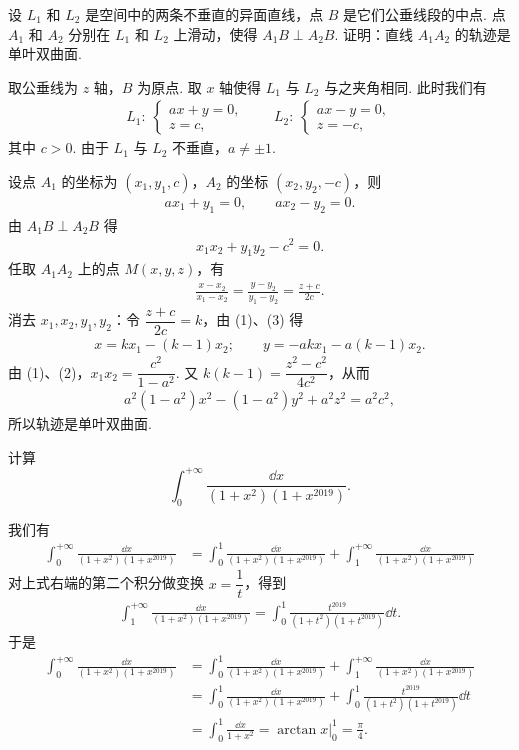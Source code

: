 
设 $L_1$ 和 $L_2$ 是空间中的两条不垂直的异面直线，点 $B$ 是它们公垂线段的中点. 点 $A_1$ 和 $A_2$ 分别在 $L_1$ 和 $L_2$ 上滑动，使得 $A_1B\perp A_2B$. 证明：直线 $A_1A_2$ 的轨迹是单叶双曲面.
\begin{solution}
取公垂线为 $z$ 轴，$B$ 为原点. 取 $x$ 轴使得 $L_1$ 与 $L_2$ 与之夹角相同. 此时我们有
\begin{align*}
L_1:\ \begin{cases}
  ax+y=0,\\
  z=c,
\end{cases}
\qquad
L_2:\ \begin{cases}
  ax-y=0,\\
  z=-c,
\end{cases}
\end{align*}
其中 $c>0$. 由于 $L_1$ 与 $L_2$ 不垂直，$a\ne\pm1$.

设点 $A_1$ 的坐标为 $(x_1,y_1,c)$，$A_2$ 的坐标 $(x_2,y_2,-c)$，则
\begin{align*}
ax_1+y_1=0,\qquad ax_2-y_2=0. \tag{1}
\end{align*}
由 $A_1B\perp A_2B$ 得
\begin{align*}
x_1x_2+y_1y_2-c^2=0. \tag{2}
\end{align*}
任取 $A_1A_2$ 上的点 $M(x,y,z)$，有
\begin{align*}
\frac{x-x_2}{x_1-x_2}=\frac{y-y_2}{y_1-y_2}=\frac{z+c}{2c}. \tag{3}
\end{align*}
消去 $x_1,x_2,y_1,y_2$：令 $\dfrac{z+c}{2c}=k$，由 (1)、(3) 得
\begin{align*}
x=kx_1-(k-1)x_2;\qquad y=-akx_1-a(k-1)x_2.
\end{align*}
由 (1)、(2)，$x_1x_2=\dfrac{c^2}{1-a^2}$. 又 $k(k-1)=\dfrac{z^2-c^2}{4c^2}$，从而
\begin{align*}
a^2(1-a^2)x^2-(1-a^2)y^2+a^2z^2=a^2c^2,
\end{align*}
所以轨迹是单叶双曲面.
\end{solution}

计算
\[
  \int_0^{+\infty}\frac{\dd x}{(1+x^2)(1+x^{2019})}.
\]
\begin{solution}
我们有
\begin{align*}
\int_0^{+\infty}\frac{\dd x}{(1+x^2)(1+x^{2019})}
&=\int_0^1\frac{\dd x}{(1+x^2)(1+x^{2019})}+\int_1^{+\infty}\frac{\dd x}{(1+x^2)(1+x^{2019})}
\end{align*}
对上式右端的第二个积分做变换 $x=\dfrac{1}{t}$，得到
\begin{align*}
\int_1^{+\infty}\frac{\dd x}{(1+x^2)(1+x^{2019})}=\int_0^1\frac{t^{2019}}{(1+t^2)(1+t^{2019})}\dd t.
\end{align*}
于是
\begin{align*}
\int_0^{+\infty}\frac{\dd x}{(1+x^2)(1+x^{2019})}
&=\int_0^1\frac{\dd x}{(1+x^2)(1+x^{2019})}+\int_1^{+\infty}\frac{\dd x}{(1+x^2)(1+x^{2019})}\\
&=\int_0^1\frac{\dd x}{(1+x^2)(1+x^{2019})}+\int_0^1\frac{t^{2019}}{(1+t^2)(1+t^{2019})}\dd t\\
&=\int_0^1\frac{\dd x}{1+x^2}=\arctan x\Big|_0^1=\frac{\pi}{4}.
\end{align*}
\end{solution}

